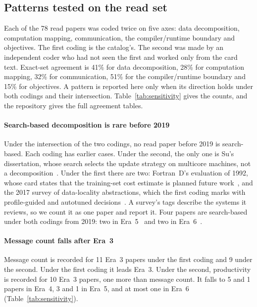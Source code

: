 \subsection{Patterns tested on the read set}
Each of the 78 read papers was coded twice on five axes: data decomposition, computation mapping, communication, the compiler/runtime boundary and objectives. The first coding is the catalog's. The second was made by an independent coder who had not seen the first and worked only from the card text. Exact-set agreement is 41\% for data decomposition, 28\% for computation mapping, 32\% for communication, 51\% for the compiler/runtime boundary and 15\% for objectives. A pattern is reported here only when its direction holds under both codings and their intersection. Table~\ref{tab:sensitivity} gives the counts, and the repository gives the full agreement tables.



\paragraph{Search-based decomposition is rare before 2019}
Under the intersection of the two codings, no read paper before 2019 is search-based. Each coding has earlier cases. Under the second, the only one is Su's dissertation, whose search selects the update strategy on multicore machines, not a decomposition~\cite{su2010irregular}. Under the first there are two: Fortran~D's evaluation of 1992, whose card states that the training-set cost estimate is planned future work~\cite{hiranandani1992evaluation}, and the 2017 survey of data-locality abstractions, which the first coding marks with profile-guided and autotuned decisions~\cite{unat2017trends}. A survey's tags describe the systems it reviews, so we count it as one paper and report it. Four papers are search-based under both codings from 2019: two in Era~5~\cite{jia2019flexflow,narayanan2019pipedream} and two in Era~6~\cite{zheng2022alpa,thangamani2024polyhedral}. 
\paragraph{Message count falls after Era~3}
Message count is recorded for 11 Era~3 papers under the first coding and 9 under the second. Under the first coding it leads Era~3. Under the second, productivity is recorded for 10 Era~3 papers, one more than message count. It falls to 5 and 1 papers in Era~4, 3 and 1 in Era~5, and at most one in Era~6 (Table~\ref{tab:sensitivity}). 
